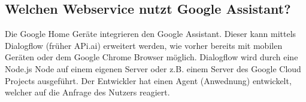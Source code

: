 \subsection{Welchen Webservice nutzt Google Assistant?}
Die Google Home Ger\"{a}te integrieren den Google Assistant. Dieser kann mittels Dialogflow
(fr\"{u}her APi.ai) erweitert werden, wie vorher bereits mit mobilen Ger\"{a}ten oder dem Google Chrome
Browser m\"{o}glich. Dialogflow wird durch eine Node.js Node auf einem eigenen Server oder z.B.
einem Server des Google Cloud Projects ausgef\"{u}hrt. Der Entwickler hat einen Agent (Anwednung)
entwickelt, welcher auf die Anfrage des Nutzers reagiert.
